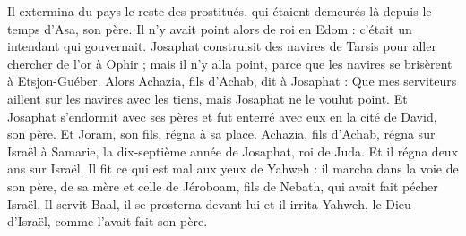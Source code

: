 \begin{multicols}{2}
Il extermina du pays le reste des prostitués, qui étaient demeurés là depuis le temps d'Asa, son père.
Il n'y avait point alors de roi en Edom : c’était un intendant qui gouvernait.
Josaphat construisit des navires de Tarsis pour aller chercher de l'or à Ophir ; mais il n'y alla point, parce que les navires se brisèrent à Etsjon-Guéber.
Alors Achazia, fils d'Achab, dit à Josaphat : Que mes serviteurs aillent sur les navires avec les tiens, mais Josaphat ne le voulut point.
Et Josaphat s’endormit avec ses pères et fut enterré avec eux en la cité de David, son père. Et Joram, son fils, régna à sa place.
Achazia, fils d'Achab, régna sur Israël à Samarie, la dix-septième année de Josaphat, roi de Juda. Et il régna deux ans sur Israël.
Il fit ce qui est mal aux yeux de Yahweh : il marcha dans la voie de son père, de sa mère et celle de Jéroboam, fils de Nebath, qui avait fait pécher Israël.
Il servit Baal, il se prosterna devant lui et il irrita Yahweh, le Dieu d'Israël, comme l’avait fait son père.
\PPE{}
\end{multicols}
